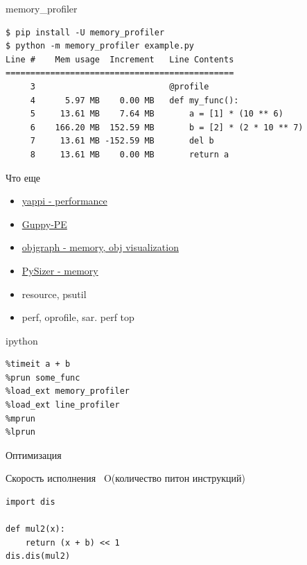 \documentclass{article}
\begin{document}
\begin{center} memory\_profiler \end{center}
\Large
\begin{verbatim}
$ pip install -U memory_profiler
$ python -m memory_profiler example.py
Line #    Mem usage  Increment   Line Contents
==============================================
     3                           @profile
     4      5.97 MB    0.00 MB   def my_func():
     5     13.61 MB    7.64 MB       a = [1] * (10 ** 6)
     6    166.20 MB  152.59 MB       b = [2] * (2 * 10 ** 7)
     7     13.61 MB -152.59 MB       del b
     8     13.61 MB    0.00 MB       return a
\end{verbatim}
\LARGE
\newpage

\begin{center} Что еще \end{center}
\begin{itemize}
    \item \href{https://bitbucket.org/sumerc/yappi/}{yappi - performance}
    \item \href{http://guppy-pe.sourceforge.net/}{Guppy-PE}
    \item \href{http://mg.pov.lt/objgraph/}{objgraph - memory, obj visualization}
    \item \href{http://pysizer.8325.org/}{PySizer - memory}
    \item resource, psutil
    \item perf, oprofile, sar. perf top
\end{itemize}
\newpage

\begin{center} ipython \end{center}
\begin{verbatim}
%timeit a + b
%prun some_func
%load_ext memory_profiler
%load_ext line_profiler
%mprun
%lprun
\end{verbatim}
\newpage 

\begin{center} Оптимизация \end{center}
Скорость исполнения ~O(количество питон инструкций)
\begin{lstlisting}
import dis

def mul2(x):
    return (x + b) << 1
dis.dis(mul2)
\end{lstlisting}
\end{document}

